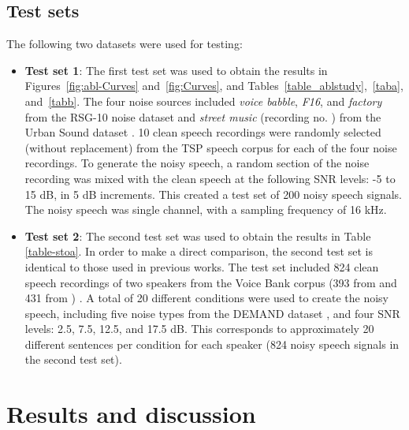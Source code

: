 \documentclass[letterpaper]{article} \usepackage{aaai20}  \usepackage{times}  \usepackage{helvet} \usepackage{courier}  \usepackage[hyphens]{url}  \usepackage{graphicx} \urlstyle{rm} \def\UrlFont{\rm}  \usepackage{graphicx}  \frenchspacing  \setlength{\pdfpagewidth}{8.5in}  \setlength{\pdfpageheight}{11in}
\begin{document}
\subsection{Test sets}
The following two datasets were used for testing:
\begin{itemize}
\item {\textbf{Test set 1}:} The first test set was used to obtain the results in Figures~\ref{fig:abl-Curves} and~\ref{fig:Curves}, and Tables~\ref{table_ablstudy},~\ref{taba}, and~\ref{tabb}. The four noise sources included \textit{voice babble}, \textit{F16}, and \textit{factory} from the RSG-10 noise dataset \cite{steeneken1988description} and \textit{street music} (recording no. ) from the Urban Sound dataset \cite{salamon2014dataset}. 10 clean speech recordings were randomly selected (without replacement) from the TSP speech corpus \cite{kabal2002tsp} for each of the four noise recordings. To generate the noisy speech, a random section of the noise recording was mixed with the clean speech at the following SNR levels: -5 to 15 dB, in 5 dB increments. This created a test set of 200 noisy speech signals. The noisy speech was single channel, with a sampling frequency of 16 kHz.
\item {\textbf{Test set 2}:} The second test set was used to obtain the results in Table \ref{table-stoa}. In order to make a direct comparison, the second test set is identical to those used in previous works. The test set included 824 clean speech recordings of two speakers from the Voice Bank corpus (393 from  and 431 from ) \cite{6709856}. A total of 20 different conditions were used to create the noisy speech, including five noise types from the DEMAND dataset \cite{thiemann2013diverse}, and four SNR levels: 2.5, 7.5, 12.5, and 17.5 dB. This corresponds to approximately 20 different
sentences per condition for each speaker (824 noisy speech signals in the second test set). 
\end{itemize}

\section{Results and discussion} \label{secc}
\end{document}
